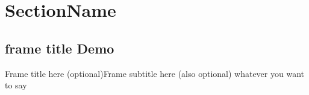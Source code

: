 \section{SectionName}
\subsection{frame title Demo}
\begin{frame}{Frame title here (optional)}{Frame subtitle here (also optional)}
  whatever you want to say\\
\end{frame}
